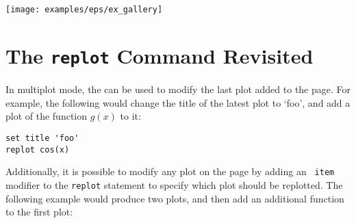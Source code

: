 {\newline
{}\newline
{}\newline
{}\newline
{}\newline
}\\{\footnotesize
{}\newline
{}\newline
{}\newline
{}\newline
{}\newline
}\\{\footnotesize
{}\newline
{}\newline
{}
}\vspace{3mm}

\centerline{\texttt{[image: examples/eps/ex\_gallery]}}

\section{The {\tt replot} Command Revisited}

In multiplot mode, the  can be used to modify the last plot
added to the page. For example, the following would change the title of the
latest plot to `foo', and add a plot of the function $g(x)$ to it:

\begin{verbatim}
set title 'foo'
replot cos(x)
\end{verbatim}

Additionally, it is possible to modify any plot on the page by adding an {\tt
item} modifier to the {\tt replot} statement to specify which plot should be
replotted.  The following example would produce two plots, and then add an
additional function to the first plot:

